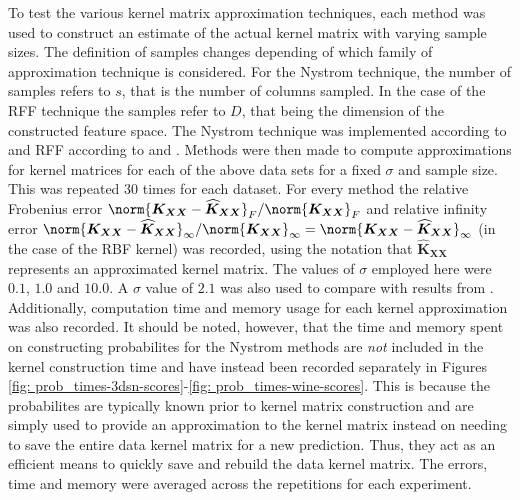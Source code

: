 To test the various kernel matrix approximation techniques, each method was used to construct an estimate of the actual kernel matrix with varying sample sizes. The definition of samples changes depending of which family of approximation technique is considered. For the Nystrom technique, the number of samples refers to $s$, that is the number of columns sampled. In the case of the RFF technique the samples refer to $D$, that being the dimension of the constructed feature space. The Nystrom technique was implemented according to \cite{JMLR:v6:drineas05a} and RFF according to \cite{NIPS2007_013a006f} and \cite{LiuFanghui2021RFfK}. Methods were then made to compute approximations for kernel matrices for each of the above data sets for a fixed $\sigma$ and sample size. This was repeated 30 times for each dataset. For every method the relative Frobenius error $\norm{\bm{K_{XX}} - \widehat{\bm{K}}_{\bm{XX}}}_{F} / \norm{\bm{K_{XX}}}_{F}$ and relative infinity error $\norm{\bm{K_{XX}} - \widehat{\bm{K}}_{\bm{XX}}}_{\infty} / \norm{\bm{K_{XX}}}_{\infty} = \norm{\bm{K_{XX}} - \widehat{\bm{K}}_{\bm{XX}}}_{\infty}$ (in the case of the RBF kernel) was recorded, using the notation that $\widehat{\bm{K}}_{\bm{XX}}$ represents an approximated kernel matrix. The values of $\sigma$ employed here were $0.1$, $1.0$ and $10.0$. A $\sigma$ value of $2.1$ was also used to compare with results from \cite{JMLR:v6:drineas05a}. Additionally, computation time and memory usage for each kernel approximation was also recorded. It should be noted, however, that the time and memory spent on constructing probabilites for the Nystrom methods are {\it not} included in the kernel construction time and have instead been recorded separately in Figures \ref{fig: prob_times-3dsn-scores}-\ref{fig: prob_times-wine-scores}. This is because the probabilites are typically known prior to kernel matrix construction and are simply used to provide an approximation to the kernel matrix instead on needing to save the entire data kernel matrix for a new prediction. Thus, they act as an efficient means to quickly save and rebuild the data kernel matrix. The errors, time and memory were averaged across the repetitions for each experiment.


